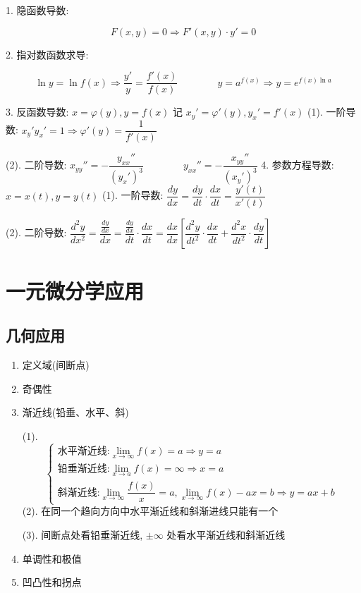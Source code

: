 \begin{theorem}[特殊函数导函数]
1. 隐函数导数: 

$$F(x,y) = 0\Rightarrow F'(x,y) \cdot y'= 0$$

2. 指对数函数求导: 

$$\ln y =\ln f(x)\Rightarrow \frac{y'}{y} = \frac{f'(x)}{f(x)}\qquad\qquad y = a^{f(x)}\Rightarrow y = e^{f(x)\ln a}$$

3. 反函数导数: $x = \varphi(y),y=f(x)$ 记 $x_{y}' = \varphi'(y),y_{x}' = f'(x)$
(1). 一阶导数: $x_{y}' y_{x}' =1\Rightarrow \varphi'(y) = \dfrac{1}{f'(x)}$

(2). 二阶导数: $x_{yy}'' =-\dfrac{y_{xx}''}{(y_{x}')^{3}}\qquad\qquad y_{xx}'' = -\dfrac{x_{yy}''}{(x_{y}')^{3}}$
4. 参数方程导数: $x = x(t), y = y(t)$
(1). 一阶导数: $\dfrac{dy}{dx} = \dfrac{dy}{dt}\cdot \dfrac{dx}{dt} = \dfrac{y'(t)}{x'(t)}$

(2). 二阶导数: $\dfrac{d^{2}y}{dx^{2}} = \dfrac{\frac{dy}{dx}}{dx} = \dfrac{\frac{dy}{dx}}{dt}\cdot \dfrac{dx}{dt} = \dfrac{dx}{dx}\left[\dfrac{d^{2}y}{dt^{2}}\cdot \dfrac{dx}{dt}+\dfrac{d^{2}x}{dt^{2}}\cdot \dfrac{dy}{dt}\right]$
\end{theorem}

\section{一元微分学应用}
\subsection{几何应用}
\begin{definition}[函数图像要点]
	\begin{enumerate}
		\item 定义域(间断点)
		\item 奇偶性
		\item 渐近线(铅垂、水平、斜)
		\begin{anymark}[Points]
			(1). $$\begin{cases}\text{水平渐近线:} \lim\limits_{x\to\infty}f(x)=a\Rightarrow y=a\\
				\text{铅垂渐近线:} \lim\limits_{x\to a}f(x)=\infty\Rightarrow x=a \\
				\text{斜渐近线:} \lim\limits_{x\to\infty}\dfrac{f(x)}{x}=a, \lim\limits_{x\to\infty}f(x)-ax = b\Rightarrow y=ax+b
			\end{cases}$$
			(2). 在同一个趋向方向中水平渐近线和斜渐进线只能有一个

			(3). 间断点处看铅垂渐近线, $\pm \infty$ 处看水平渐近线和斜渐近线
		\end{anymark}
		\item 单调性和极值
		\item 凹凸性和拐点
	\end{enumerate}
\end{definition}

